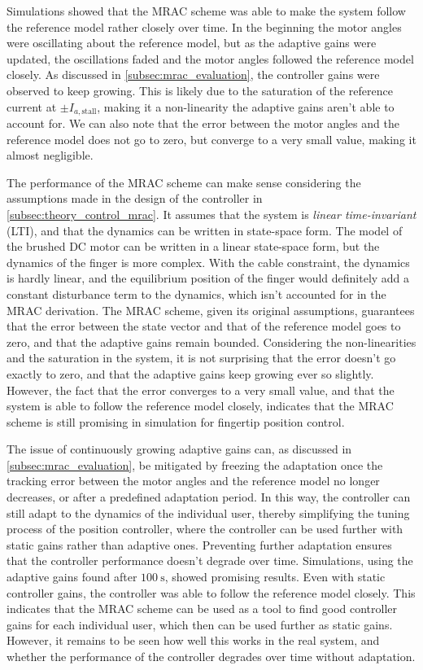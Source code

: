 Simulations showed that the MRAC scheme was able to make the system follow the reference model rather closely over time. In the beginning the motor angles were oscillating about the reference model, but as the adaptive gains were updated, the oscillations faded and the motor angles followed the reference model closely. As discussed in \cref{subsec:mrac_evaluation}, the controller gains were observed to keep growing. This is likely due to the saturation of the reference current at $\pm I_{a, \text{stall}}$, making it a non-linearity the adaptive gains aren't able to account for. We can also note that the error between the motor angles and the reference model does not go to zero, but converge to a very small value, making it almost negligible. 

The performance of the MRAC scheme can make sense considering the assumptions made in the design of the controller in \cref{subsec:theory_control_mrac}. It assumes that the system is \textit{linear time-invariant} (LTI), and that the dynamics can be written in state-space form. The model of the brushed DC motor can be written in a linear state-space form, but the dynamics of the finger is more complex. With the cable constraint, the dynamics is hardly linear, and the equilibrium position of the finger would definitely add a constant disturbance term to the dynamics, which isn't accounted for in the MRAC derivation. The MRAC scheme, given its original assumptions, guarantees that the error between the state vector and that of the reference model goes to zero, and that the adaptive gains remain bounded. Considering the non-linearities and the saturation in the system, it is not surprising that the error doesn't go exactly to zero, and that the adaptive gains keep growing ever so slightly. However, the fact that the error converges to a very small value, and that the system is able to follow the reference model closely, indicates that the MRAC scheme is still promising in simulation for fingertip position control.

The issue of continuously growing adaptive gains can, as discussed in \cref{subsec:mrac_evaluation}, be mitigated by freezing the adaptation once the tracking error between the motor angles and the reference model no longer decreases, or after a predefined adaptation period. In this way, the controller can still adapt to the dynamics of the individual user, thereby simplifying the tuning process of the position controller, where the controller can be used further with static gains rather than adaptive ones. Preventing further adaptation ensures that the controller performance doesn't degrade over time. Simulations, using the adaptive gains found after $\SI{100}{\second}$, showed promising results. Even with static controller gains, the controller was able to follow the reference model closely. This indicates that the MRAC scheme can be used as a tool to find good controller gains for each individual user, which then can be used further as static gains. However, it remains to be seen how well this works in the real system, and whether the performance of the controller degrades over time without adaptation.


